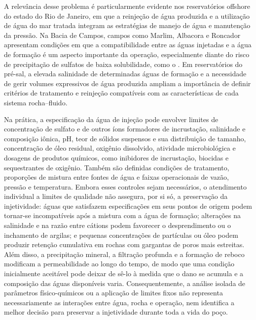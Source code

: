 \documentclass[10pt,a4paper]{article}
\begin{document}
A relevância desse problema é particularmente evidente nos reservatórios offshore do estado do Rio de Janeiro, em que a reinjeção de água produzida e a utilização de água do mar tratada integram as estratégias de manejo de água e manutenção da pressão. Na Bacia de Campos, campos como Marlim, Albacora e Roncador apresentam condições em que a compatibilidade entre as águas injetadas e a água de formação é um aspecto importante da operação, especialmente diante do risco de precipitação de sulfatos de baixa solubilidade, como o  \cite{rocha2001,bezerra2004}. Em reservatórios do pré-sal, a elevada salinidade de determinadas águas de formação e a necessidade de gerir volumes expressivos de água produzida ampliam a importância de definir critérios de tratamento e reinjeção compatíveis com as características de cada sistema rocha--fluido.

Na prática, a especificação da água de injeção pode envolver limites de concentração de sulfato e de outros íons formadores de incrustação, salinidade e composição iônica, pH, teor de sólidos suspensos e sua distribuição de tamanho, concentração de óleo residual, oxigênio dissolvido, atividade microbiológica e dosagens de produtos químicos, como inibidores de incrustação, biocidas e sequestrantes de oxigênio. Também são definidas condições de tratamento, proporções de mistura entre fontes de água e faixas operacionais de vazão, pressão e temperatura. Embora esses controles sejam necessários, o atendimento individual a limites de qualidade não assegura, por si só, a preservação da injetividade: águas que satisfazem especificações em seus pontos de origem podem tornar-se incompatíveis após a mistura com a água de formação; alterações na salinidade e na razão entre cátions podem favorecer o desprendimento ou o inchamento de argilas; e pequenas concentrações de partículas ou óleo podem produzir retenção cumulativa em rochas com gargantas de poros mais estreitas. Além disso, a precipitação mineral, a filtração profunda e a formação de reboco modificam a permeabilidade ao longo do tempo, de modo que uma condição inicialmente aceitável pode deixar de sê-lo à medida que o dano se acumula e a composição das águas disponíveis varia. Consequentemente, a análise isolada de parâmetros físico-químicos ou a aplicação de limites fixos não representa necessariamente as interações entre água, rocha e operação, nem identifica a melhor decisão para preservar a injetividade durante toda a vida do poço.
\end{document}
